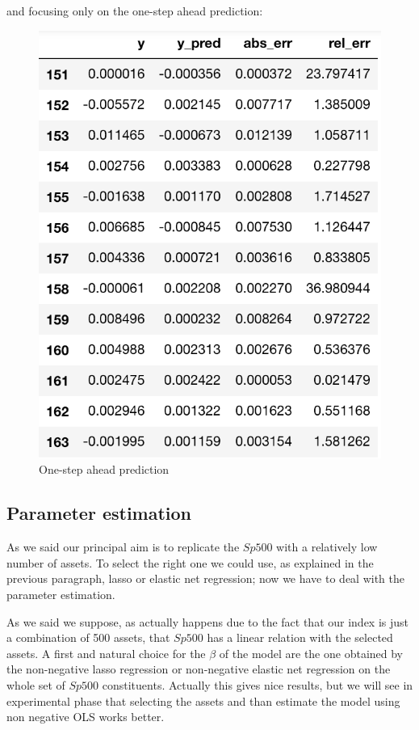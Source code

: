 \documentclass{article}%
\begin{document}
and focusing only on the one-step ahead prediction:
\begin{figure}[h!]
  \centering
  \includegraphics[scale=0.6]{pred_step1.png}
  \caption{One-step ahead prediction}
  \label{err_step}
\end{figure}



\subsection{Parameter estimation}
As we said our principal aim is to replicate the $Sp500$ with a relatively low number of assets. To select the right one we could use, as explained in the previous paragraph, lasso or elastic net regression; now we have to deal with the parameter estimation.

As we said we suppose, as actually happens due to the fact that our index is just a combination of 500 assets, that $Sp500$ has a linear relation with the selected assets. A first and natural choice for the $\beta$ of the model are the one obtained by the non-negative lasso regression or non-negative elastic net regression on the whole set of $Sp500$ constituents. Actually this gives nice results, but we will see in experimental phase that selecting the assets and than estimate the model using non negative OLS works better. 
\\
\end{document}
